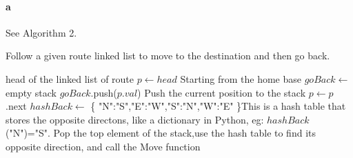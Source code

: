 \documentclass[paper=a4, fontsize=11pt]{scrartcl} %
\numberwithin{equation}{section} %
\numberwithin{figure}{section} %
\numberwithin{table}{section} %
\begin{document}
\paragraph{a} 
See Algorithm 2.
\begin{algorithm}
	\caption{Follow a given route linked list to move to the destination and then go back.}
	\begin{algorithmic}[1]
		\Require head of the linked list of route
			\State $p\gets head$  \Comment Starting from the home base
			\State $goBack\gets$ empty stack
				\State {}
				\State $goBack$.push($p.val$) \Comment Push the current position to the stack
				\State $p\gets p$.next
            \EndWhile
            \State $hashBack\gets$ \{ "N":"S","E":"W","S":"N","W":"E" \}\Comment This is a hash table that stores the opposite directons, like a dictionary in Python, eg: $hashBack$("N")="S".
				\State {} \Comment Pop the top element of the stack,use the hash table to find its opposite direction, and call the Move function
			\EndWhile
			
		\EndFunction
	\end{algorithmic}

\end{algorithm}
\end{document}
